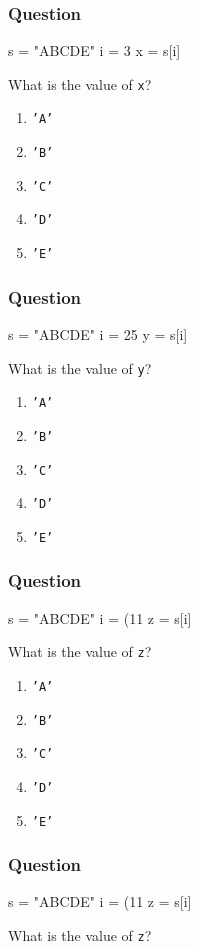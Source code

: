 \documentclass[11pt]{beamer}
\begin{document}
\begin{frame}[fragile]
  \frametitle{Question}
  \Enlarge

  \begin{semiverbatim}
s = "ABCDE"
i = 3
x = s[i]
  \end{semiverbatim}

  What is the value of \texttt{x}?
  \begin{enumerate}[label=\Alph*]
  \item  \texttt{'A'}
  \item  \texttt{'B'}
  \item  \texttt{'C'}
  \item  \texttt{'D'}
  \item  \texttt{'E'}
  \end{enumerate}
\end{frame}

\begin{frame}[fragile]
  \frametitle{Question}
  \Enlarge

  \begin{semiverbatim}
s = "ABCDE"
i = 25 %
y = s[i]
  \end{semiverbatim}

  What is the value of \texttt{y}?
  \begin{enumerate}[label=\Alph*]
  \item  \texttt{'A'}
  \item  \texttt{'B'}
  \item  \texttt{'C'}
  \item  \texttt{'D'}
  \item  \texttt{'E'}
  \end{enumerate}
\end{frame}

\begin{frame}[fragile]
  \frametitle{Question}
  \Enlarge

  \begin{semiverbatim}
s = "ABCDE"
i = (11 %
z = s[i]
  \end{semiverbatim}

  What is the value of \texttt{z}?
  \begin{enumerate}[label=\Alph*]
  \item  \texttt{'A'}
  \item  \texttt{'B'}
  \item  \texttt{'C'}
  \item  \texttt{'D'}
  \item  \texttt{'E'}
  \end{enumerate}
\end{frame}

\begin{frame}[fragile]
  \frametitle{Question}
  \Enlarge

  \begin{semiverbatim}
s = "ABCDE"
i = (11 %
z = s[i]
  \end{semiverbatim}

  What is the value of \texttt{z}?
\end{frame}
\end{document}
